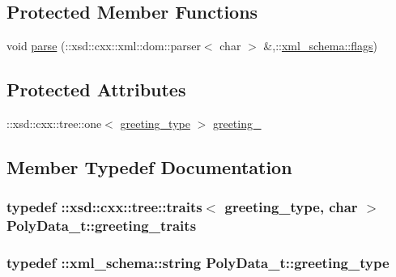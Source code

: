\subsection*{Protected Member Functions}
\begin{DoxyCompactItemize}
\item 
void \hyperlink{classPolyData__t_a96ef26c9f46b47eb6e1206d1ef8d98b3}{parse} (\+::xsd\+::cxx\+::xml\+::dom\+::parser$<$ char $>$ \&,\+::\hyperlink{namespacexml__schema_a0612287d030cb2732d31a45b258fdc87}{xml\+\_\+schema\+::flags})
\end{DoxyCompactItemize}
\subsection*{Protected Attributes}
\begin{DoxyCompactItemize}
\item 
\+::xsd\+::cxx\+::tree\+::one$<$ \hyperlink{classPolyData__t_ae1f86bd7b6a37a0d0851de8a44627177}{greeting\+\_\+type} $>$ \hyperlink{classPolyData__t_ac266677696c0b4ad0a1a51d8ff6d3c04}{greeting\+\_\+}
\end{DoxyCompactItemize}


\subsection{Member Typedef Documentation}
\subsubsection[{\texorpdfstring{greeting\+\_\+traits}{greeting_traits}}]{\setlength{\rightskip}{0pt plus 5cm}typedef \+::xsd\+::cxx\+::tree\+::traits$<$ {\bf greeting\+\_\+type}, char $>$ {\bf Poly\+Data\+\_\+t\+::greeting\+\_\+traits}}\hypertarget{classPolyData__t_a0825d12eafceffcedbb147730b8bf8a6}{}\label{classPolyData__t_a0825d12eafceffcedbb147730b8bf8a6}
\subsubsection[{\texorpdfstring{greeting\+\_\+type}{greeting_type}}]{\setlength{\rightskip}{0pt plus 5cm}typedef \+::{\bf xml\+\_\+schema\+::string} {\bf Poly\+Data\+\_\+t\+::greeting\+\_\+type}}\hypertarget{classPolyData__t_ae1f86bd7b6a37a0d0851de8a44627177}{}\label{classPolyData__t_ae1f86bd7b6a37a0d0851de8a44627177}


